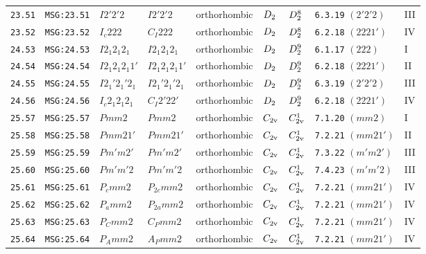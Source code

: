 \documentclass[fleqn,10pt]{jsarticle}
\begin{document}
\begin{center}
\begin{longtable}{lllllllll}
\texttt{23.51} & \texttt{MSG:23.51} & $I2'2'2$ & $I2'2'2$ & orthorhombic & $D_{\rm 2}$ & $D_{\rm 2}^{8}$ & \texttt{6.3.19} $(2'2'2)$ & III \\
\texttt{23.52} & \texttt{MSG:23.52} & $I_{c}222$ & $C_{I}222$ & orthorhombic & $D_{\rm 2}$ & $D_{\rm 2}^{8}$ & \texttt{6.2.18} $(2221')$ & IV \\ \hline
\texttt{24.53} & \texttt{MSG:24.53} & $I2_{1}2_{1}2_{1}$ & $I2_{1}2_{1}2_{1}$ & orthorhombic & $D_{\rm 2}$ & $D_{\rm 2}^{9}$ & \texttt{6.1.17} $(222)$ & I \\
\texttt{24.54} & \texttt{MSG:24.54} & $I2_{1}2_{1}2_{1}1'$ & $I2_{1}2_{1}2_{1}1'$ & orthorhombic & $D_{\rm 2}$ & $D_{\rm 2}^{9}$ & \texttt{6.2.18} $(2221')$ & II \\
\texttt{24.55} & \texttt{MSG:24.55} & $I2_{1}'2_{1}'2_{1}$ & $I2_{1}'2_{1}'2_{1}$ & orthorhombic & $D_{\rm 2}$ & $D_{\rm 2}^{9}$ & \texttt{6.3.19} $(2'2'2)$ & III \\
\texttt{24.56} & \texttt{MSG:24.56} & $I_{c}2_{1}2_{1}2_{1}$ & $C_{I}2'22'$ & orthorhombic & $D_{\rm 2}$ & $D_{\rm 2}^{9}$ & \texttt{6.2.18} $(2221')$ & IV \\ \hline
\texttt{25.57} & \texttt{MSG:25.57} & $Pmm2$ & $Pmm2$ & orthorhombic & $C_{\rm 2v}$ & $C_{\rm 2v}^{1}$ & \texttt{7.1.20} $(mm2)$ & I \\
\texttt{25.58} & \texttt{MSG:25.58} & $Pmm21'$ & $Pmm21'$ & orthorhombic & $C_{\rm 2v}$ & $C_{\rm 2v}^{1}$ & \texttt{7.2.21} $(mm21')$ & II \\
\texttt{25.59} & \texttt{MSG:25.59} & $Pm'm2'$ & $Pm'm2'$ & orthorhombic & $C_{\rm 2v}$ & $C_{\rm 2v}^{1}$ & \texttt{7.3.22} $(m'm2')$ & III \\
\texttt{25.60} & \texttt{MSG:25.60} & $Pm'm'2$ & $Pm'm'2$ & orthorhombic & $C_{\rm 2v}$ & $C_{\rm 2v}^{1}$ & \texttt{7.4.23} $(m'm'2)$ & III \\
\texttt{25.61} & \texttt{MSG:25.61} & $P_{c}mm2$ & $P_{2c}mm2$ & orthorhombic & $C_{\rm 2v}$ & $C_{\rm 2v}^{1}$ & \texttt{7.2.21} $(mm21')$ & IV \\
\texttt{25.62} & \texttt{MSG:25.62} & $P_{a}mm2$ & $P_{2a}mm2$ & orthorhombic & $C_{\rm 2v}$ & $C_{\rm 2v}^{1}$ & \texttt{7.2.21} $(mm21')$ & IV \\
\texttt{25.63} & \texttt{MSG:25.63} & $P_{C}mm2$ & $C_{P}mm2$ & orthorhombic & $C_{\rm 2v}$ & $C_{\rm 2v}^{1}$ & \texttt{7.2.21} $(mm21')$ & IV \\
\texttt{25.64} & \texttt{MSG:25.64} & $P_{A}mm2$ & $A_{P}mm2$ & orthorhombic & $C_{\rm 2v}$ & $C_{\rm 2v}^{1}$ & \texttt{7.2.21} $(mm21')$ & IV \\

\end{longtable}
\end{center}
\end{document}
